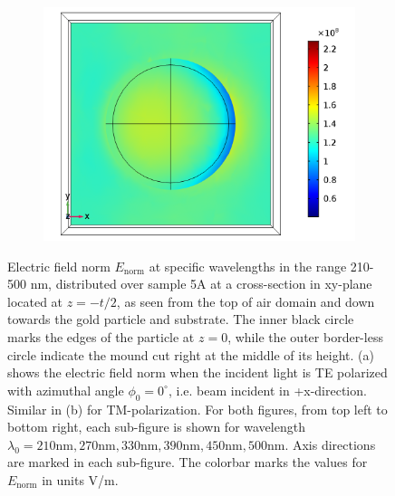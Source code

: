 \begin{figure}[htb!]
\begin{subfigure}{0.32\textwidth}
        \centering
        \includegraphics[width=\linewidth]{figures/ch4/S5A/FieldDistribution/Sample5A_TM_Slice@z=-05t_wl=500_notitle.png}
   \end{subfigure}
   \vspace{0.7cm}
   \caption{Electric field norm $E_{\text{norm}}$ at specific wavelengths in the range 210-500 nm, distributed over sample 5A at a cross-section in xy-plane located at $z=-t/2$, as seen from the top of air domain and down towards the gold particle and substrate. The inner black circle marks the edges of the particle at $z=0$, while the outer border-less circle indicate the mound cut right at the middle of its height. (a) shows the electric field norm when the incident light is TE polarized with azimuthal angle $\phi_0=0^\circ$, i.e. beam incident in +x-direction. Similar in (b) for TM-polarization. For both figures, from top left to bottom right, each sub-figure is shown for wavelength $\lambda_0=210 \text{nm}, 270 \text{nm}, 330 \text{nm}, 390 \text{nm}, 450 \text{nm}, 500 \text{nm}$. Axis directions are marked in each sub-figure. The colorbar marks the values for $E_{\text{norm}}$ in units V/m. }
   \label{fig:S5A_normE_distribution_210-500}
\end{figure}

